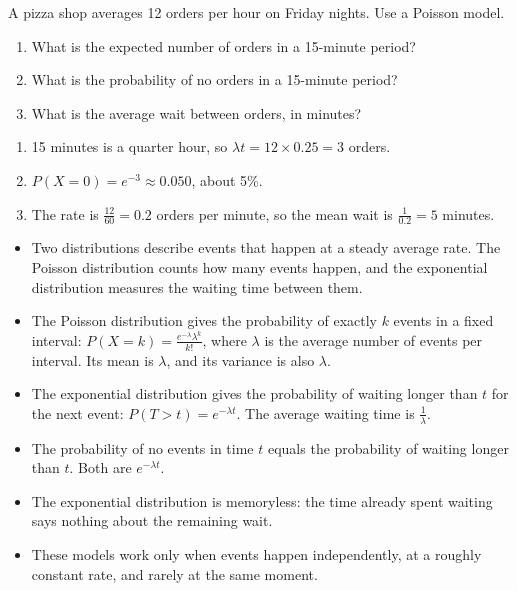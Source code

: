 \begin{Exercise}[label=pe4, title=Pizza Drivers]
A pizza shop averages 12 orders per hour on Friday nights. Use a Poisson
model.
\begin{enumerate}
\item What is the expected number of orders in a 15-minute period?
\item What is the probability of no orders in a 15-minute period?
\item What is the average wait between orders, in minutes?
\end{enumerate}
\end{Exercise}
\begin{Answer}[ref=pe4]
\begin{enumerate}
\item 15 minutes is a quarter hour, so $\lambda t = 12 \times 0.25 = 3$ orders.
\item $P(X = 0) = e^{-3} \approx 0.050$, about 5\%.
\item The rate is $\frac{12}{60} = 0.2$ orders per minute, so the mean wait is $\frac{1}{0.2} = 5$ minutes.
\end{enumerate}
\end{Answer}

\begin{mdframed}[style=important, frametitle={Key Ideas}]
\begin{itemize}
\item Two distributions describe events that happen at a steady average rate. The Poisson distribution counts how many events happen, and the exponential distribution measures the waiting time between them.
\item The Poisson distribution gives the probability of exactly $k$ events in a fixed interval: $P(X = k) = \frac{e^{-\lambda}\lambda^k}{k!}$, where $\lambda$ is the average number of events per interval. Its mean is $\lambda$, and its variance is also $\lambda$.
\item The exponential distribution gives the probability of waiting longer than $t$ for the next event: $P(T > t) = e^{-\lambda t}$. The average waiting time is $\frac{1}{\lambda}$.
\item The probability of no events in time $t$ equals the probability of waiting longer than $t$. Both are $e^{-\lambda t}$.
\item The exponential distribution is memoryless: the time already spent waiting says nothing about the remaining wait.
\item These models work only when events happen independently, at a roughly constant rate, and rarely at the same moment.
\end{itemize}
\end{mdframed}
